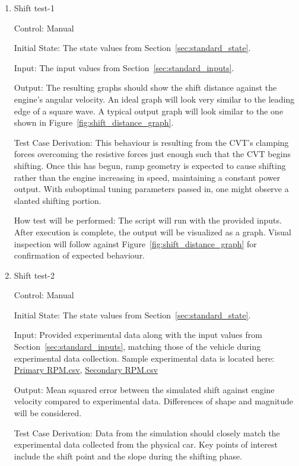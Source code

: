 \documentclass[12pt, titlepage]{article}
\begin{document}
\begin{enumerate}
  
  \item{Shift test-1\\}
  
  Control: Manual
            
  Initial State: The state values from Section~\ref{sec:standard_state}.
  
  Input: The input values from Section~\ref{sec:standard_inputs}.
            
  Output: The resulting graphs should show the shift distance against the engine's angular velocity. An ideal graph will look very similar to the leading edge of a square wave. A typical output graph will look similar to the one shown in Figure~\ref{fig:shift_distance_graph}.
  
  Test Case Derivation: This behaviour is resulting from the CVT's clamping forces overcoming the resistive forces just enough such that the CVT begins shifting. Once this has begun, ramp geometry is expected to cause shifting rather than the engine increasing in speed, maintaining a constant power output. With suboptimal tuning parameters passed in, one might observe a slanted shifting portion.
  
  How test will be performed: The script will run with the provided inputs. After execution is complete, the output will be visualized as a graph. Visual inspection will follow against Figure~\ref{fig:shift_distance_graph} for confirmation of expected behaviour.
  
  \item{Shift test-2\\}

  Control: Manual

  Initial State: The state values from Section~\ref{sec:standard_state}.

  Input: Provided experimental data along with the input values from Section~\ref{sec:standard_inputs}, matching those of the vehicle during experimental data collection. Sample experimental data is located here: \href{https://github.com/gr812b/CVT-Simulator/experimental-data/RPM%20PRIM.csv}{Primary RPM.csv}, \href{https://github.com/gr812b/CVT-Simulator/experimental-data/RPM%20SEC.csv}{Secondary RPM.csv} 

  Output: Mean squared error between the simulated shift against engine velocity compared to experimental data. Differences of shape and magnitude will be considered.

  Test Case Derivation: Data from the simulation should closely match the experimental data collected from the physical car. Key points of interest include the shift point and the slope during the shifting phase.


\end{enumerate}
\end{document}
